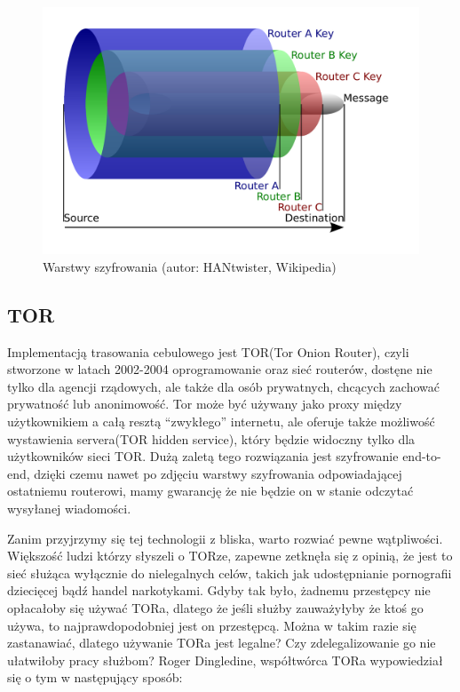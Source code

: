 \documentclass[polish]{kbk}
\begin{document}
\begin{figure}
\includegraphics[width=\textwidth]{Onion_diagram.pdf}
\caption{Warstwy szyfrowania (autor:  HANtwister, Wikipedia\cite{wikionion})}
\end{figure}

\subsection{TOR}
Implementacją trasowania cebulowego jest TOR(Tor Onion Router), czyli stworzone w 
latach 2002-2004 oprogramowanie oraz sieć routerów, dostęne nie tylko dla agencji 
rządowych, ale także dla osób prywatnych, chcących zachować prywatność lub anonimowość.
Tor może być używany jako proxy między użytkownikiem a całą resztą ``zwykłego'' 
internetu, ale oferuje także możliwość wystawienia servera(TOR hidden service), 
który będzie widoczny tylko dla użytkowników sieci TOR. Dużą zaletą tego 
rozwiązania jest szyfrowanie end-to-end, dzięki czemu nawet po zdjęciu warstwy 
szyfrowania odpowiadającej ostatniemu routerowi, mamy gwarancję że nie będzie on w 
stanie odczytać wysyłanej wiadomości.
\par
Zanim przyjrzymy się tej technologii z bliska, warto rozwiać pewne wątpliwości.
Większość ludzi którzy słyszeli o TORze, zapewne zetknęła się z opinią, że jest to sieć 
służąca wyłącznie do nielegalnych celów, takich jak udostępnianie pornografii dziecięcej
bądź handel narkotykami. Gdyby tak było, żadnemu przestępcy nie opłacałoby się używać TORa,
dlatego że jeśli służby zauważyłyby że ktoś go używa, to najprawdopodobniej jest on przestępcą.
Można w takim razie się zastanawiać, dlatego używanie TORa jest legalne? Czy zdelegalizowanie go
nie ułatwiłoby pracy służbom? Roger Dingledine, współtwórca TORa wypowiedział się o tym w 
następujący sposób:
\end{document}
